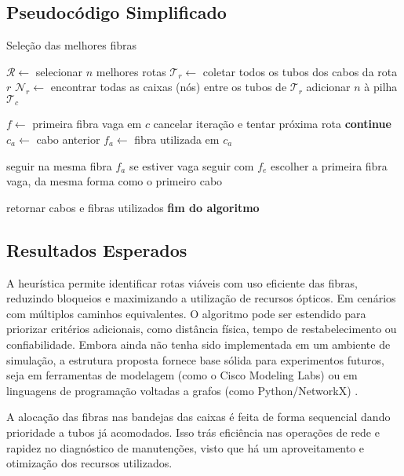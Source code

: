 \subsection{Pseudocódigo Simplificado}

\begin{algorithm}[H]
\caption{Seleção das melhores fibras}
\label{alg:the_alg}
\begin{algorithmic}[1]
\State $\mathcal{R} \gets$ selecionar $n$ melhores rotas
    \State $\mathcal{T}_r \gets$ coletar todos os tubos dos cabos da rota $r$
    \State $\mathcal{N}_r \gets$ encontrar todas as caixas (nós) entre os tubos de $\mathcal{T}_r$
            \State adicionar $n$ à pilha $\mathcal{T}_{c}$
        \EndIf
    \EndFor

            \State $f \gets$ primeira fibra vaga em $c$
                \State cancelar iteração e tentar próxima rota
                \State \textbf{continue}
            \EndIf
        \Else
            \State $c_{a} \gets$ cabo anterior
            \State $f_{a} \gets$ fibra utilizada em $c_{a}$

                \State seguir na mesma fibra $f_{a}$ se estiver vaga
                \State seguir com $f_{e}$
            \Else
                \State escolher a primeira fibra vaga, da mesma forma como o primeiro cabo
            \EndIf
        \EndIf
    \EndFor

    \State retornar cabos e fibras utilizados
\EndFor
\State \textbf{fim do algoritmo}
\end{algorithmic}
\end{algorithm}

\subsection{Resultados Esperados}

A heurística permite identificar rotas viáveis com uso eficiente das fibras,
reduzindo bloqueios e maximizando a utilização de recursos ópticos. Em cenários
com múltiplos caminhos equivalentes. O algoritmo pode ser estendido para
priorizar critérios adicionais, como distância física, tempo de
restabelecimento ou confiabilidade. Embora ainda não tenha sido implementada em
um ambiente de simulação, a estrutura proposta fornece base sólida para
experimentos futuros, seja em ferramentas de modelagem (como o Cisco Modeling
Labs) ou em linguagens de programação voltadas a grafos (como Python/NetworkX) \cite{alwayn2004optical}.

A alocação das fibras nas bandejas das caixas é feita de forma sequencial 
dando prioridade a tubos já acomodados. Isso trás eficiência nas operações de
rede e rapidez no diagnóstico de manutenções, visto que há um aproveitamento e
otimização dos recursos utilizados.

